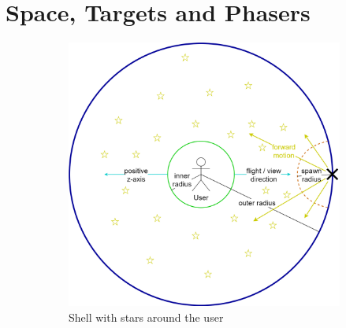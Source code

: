 \documentclass[hyperref, bachelorofscience]{cgvpub}
\begin{document}
\section{Space, Targets and Phasers} \label{sec:space}
\begin{figure}
	\centering
	\begin{subfigure}{.6\linewidth}
		\includegraphics[width=\linewidth]{../pics/stars_sphere_schema}
		\caption{Shell with stars around the user}
		\label{fig:space:shell}
	\end{subfigure}
	\hfill
	\begin{subfigure}{.31\linewidth}

\end{subfigure}
\end{figure}
\end{document}

